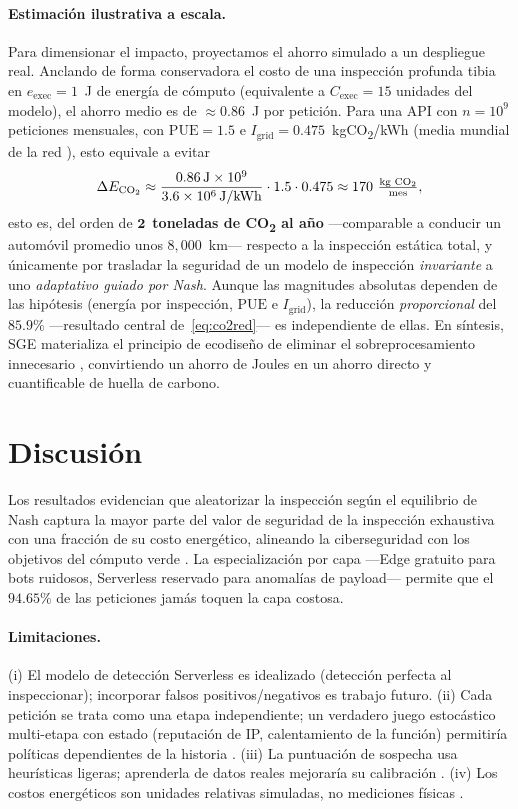 \documentclass[10pt,twocolumn]{article}
\begin{document}
\paragraph{Estimaci\'on ilustrativa a escala.} Para dimensionar el impacto,
proyectamos el ahorro simulado a un despliegue real. Anclando de forma conservadora
el costo de una inspecci\'on profunda tibia en $e_{\text{exec}}=1$~J de energ\'ia de
c\'omputo (equivalente a $C_{\text{exec}}=15$ unidades del modelo), el ahorro medio es
de $\approx 0.86$~J por petici\'on. Para una API con $n=10^{9}$ peticiones mensuales,
con $\mathrm{PUE}=1.5$ e $I_{\mathrm{grid}}=0.475$~kgCO\textsubscript{2}/kWh (media
mundial de la red \cite{masanet}), esto equivale a evitar
\[
\Delta E_{\mathrm{CO_2}} \approx \frac{0.86\,\text{J}\times 10^{9}}{3.6\times10^{6}\,\text{J/kWh}}
\cdot 1.5 \cdot 0.475 \approx 170\ \tfrac{\text{kg CO\textsubscript{2}}}{\text{mes}},
\]
esto es, del orden de $\mathbf{2}$~\textbf{toneladas de CO\textsubscript{2} al a\~no}
---comparable a conducir un autom\'ovil promedio unos $8{,}000$~km--- respecto a la
inspecci\'on est\'atica total, y \'unicamente por trasladar la seguridad de un modelo
de inspecci\'on \emph{invariante} a uno \emph{adaptativo guiado por Nash}. Aunque las
magnitudes absolutas dependen de las hip\'otesis (energ\'ia por inspecci\'on, $\mathrm{PUE}$
e $I_{\mathrm{grid}}$), la reducci\'on \emph{proporcional} del $85.9\%$
---resultado central de~\eqref{eq:co2red}--- es independiente de ellas. En s\'intesis,
SGE materializa el principio de ecodise\~no de eliminar el sobreprocesamiento
innecesario \cite{radu,murugesan}, convirtiendo un ahorro de Joules en un ahorro
directo y cuantificable de huella de carbono.

\section{Discusi\'on}
\label{sec:discussion}
Los resultados evidencian que aleatorizar la inspecci\'on seg\'un el equilibrio de
Nash captura la mayor parte del valor de seguridad de la inspecci\'on exhaustiva con
una fracci\'on de su costo energ\'etico, alineando la ciberseguridad con los objetivos
del c\'omputo verde \cite{radu,murugesan}. La especializaci\'on por capa ---Edge
gratuito para bots ruidosos, Serverless reservado para anomal\'ias de payload---
permite que el $94.65\%$ de las peticiones jam\'as toquen la capa costosa.

\paragraph{Limitaciones.} (i) El modelo de detecci\'on Serverless es idealizado
(detecci\'on perfecta al inspeccionar); incorporar falsos positivos/negativos es
trabajo futuro. (ii) Cada petici\'on se trata como una etapa independiente; un
verdadero juego estoc\'astico multi-etapa con estado (reputaci\'on de IP,
calentamiento de la funci\'on) permitir\'ia pol\'iticas dependientes de la historia
\cite{alpcan}. (iii) La puntuaci\'on de sospecha usa heur\'isticas ligeras;
aprenderla de datos reales mejorar\'ia su calibraci\'on \cite{manshaei}. (iv) Los
costos energ\'eticos son unidades relativas simuladas, no mediciones f\'isicas
\cite{murugesan}.
\end{document}

